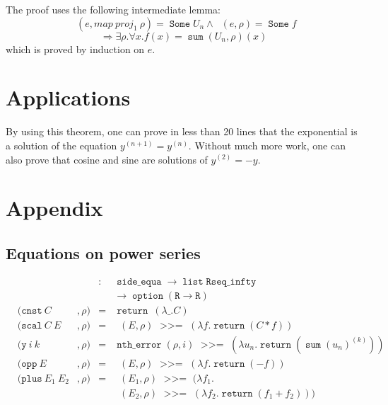 \documentclass{article}
\newcommand{\N}{\mathbb{N}}
\newcommand{\R}{\mathbb{R}}
\DeclareMathOperator{\Some}{\mathtt{Some}}
\DeclareMathOperator{\return}{\mathtt{return}}
\DeclareMathOperator{\bind}{~\mathtt{>>=}~}
\DeclareMathOperator{\ntherr}{\mathtt{nth\_error}}
\DeclareMathOperator{\option}{\mathtt{option}}
\DeclareMathOperator{\alist}{\mathtt{list}}
\DeclareMathOperator{\se}{\mathtt{side\_equa}}
\DeclareMathOperator{\Interp}{\mathtt{interp}}
\DeclareMathOperator{\IR}{\Interp_{\R}}
\DeclareMathOperator{\IN}{\Interp_{\N}}
\DeclareMathOperator{\Psum}{\mathtt{sum}}
\newenvironment{proof}[1][Proof]{\begin{trivlist}
\item[\hskip \labelsep {\bfseries #1}]}{\end{trivlist}}
\begin{document}
\begin{proof} The proof uses the following intermediate lemma:
$$\IN(e, map ~ proj_1 ~ \rho) = \Some U_n \wedge \IR(e, \rho) = \Some f$$
$$\Rightarrow \exists \rho. \forall x. f(x) = \Psum{}(U_n, \rho)(x)$$
which is proved by induction on $e$.

\end{proof}

\section{Applications}

By using this theorem, one can prove in less than 20 lines that the
exponential is a solution of the equation $y^{(n+1)} = y^{(n)}$. Without
much more work, one can also prove that cosine and sine are solutions
of $y^{(2)} = - y$.

\section{Appendix}

\subsection{Equations on power series}

\label{interpR}

$$\begin{array}{lllcl}
\IR & & & : & \se \rightarrow \alist{} \mathtt{Rseq\_infty} \\
    & & &   & \rightarrow \option{} (\texttt{R} \rightarrow \texttt{R}) \\
\IR & (\mathtt{cnst}~ C & , \rho) & = & \return~ (\lambda \_.C)\\
\IR & (\mathtt{scal}~ C ~ E &, \rho) & = & \IR(E, \rho) \bind (\lambda f. \return (C * f))\\
\IR & (\mathtt{y} ~ i ~ k &, \rho) & = & \ntherr(\rho, i) \bind (\lambda u_n. \return (\Psum{}(u_n)^{(k)})) \\
\IR & (\mathtt{opp} ~E &, \rho) & = & \IR(E,\rho) \bind (\lambda f. \return (- f))\\
\IR & (\mathtt{plus} ~ E_1 ~ E_2 &, \rho) & = & \IR(E_1,\rho) \bind (\lambda f_1.\\
    & & &   & \IR(E_2,\rho) \bind (\lambda f_2. \return (f_1 + f_2)))\\
\end{array}$$
\end{document}

